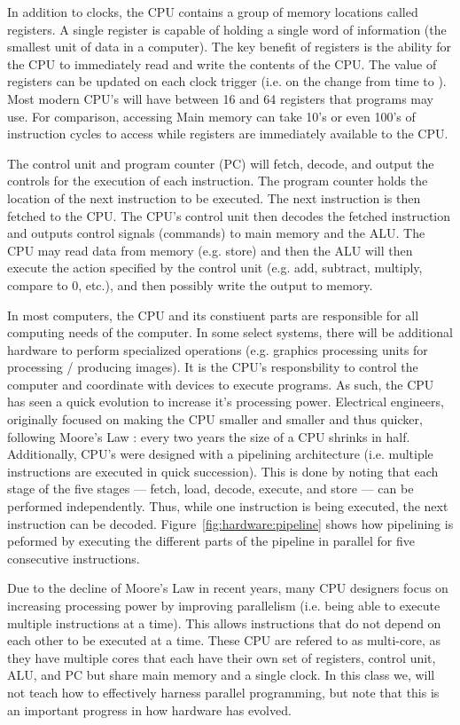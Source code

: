 In addition to clocks, the CPU contains a group of memory locations called registers.
A single register is capable of holding a single word of information (the smallest
unit of data in a computer). The key benefit of registers is the ability for the
CPU to immediately read and write the contents of the CPU. The value of registers
can be updated on each clock trigger (i.e. on the change from time  to ).
Most modern CPU's will have between 16 and 64 registers that programs may use.
For comparison, accessing Main memory can take 10's or even 100's of instruction
cycles to access while registers are immediately available to the CPU.

The control unit and program counter (PC) will fetch, decode, and output the
controls for the execution of each instruction. The program counter holds the
location of the next instruction to be executed. The next instruction is then
fetched to the CPU. The CPU's control unit then decodes the fetched instruction
and outputs control signals (commands) to main memory and the ALU. The CPU may
read data from memory (e.g. store) and then the ALU will then execute the action
specified by the control unit (e.g. add, subtract, multiply, compare to 0, etc.),
and then possibly write the output to memory.

In most computers, the CPU and its constiuent parts are responsible for all
computing needs of the computer. In some select systems, there will be additional
hardware to perform specialized operations (e.g. graphics processing units for
processing / producing images). It is the CPU's responsbility to control the
computer and coordinate with devices to execute programs. As such, the CPU
has seen a quick evolution to increase it's processing power. Electrical
engineers, originally focused on making the CPU smaller and smaller and thus
quicker, following Moore's Law : every two years the size of a CPU shrinks
in half. Additionally, CPU's were designed with a pipelining architecture
(i.e. multiple instructions are executed in quick succession). This is done
by noting that each stage of the five stages --- fetch, load,  decode, execute,
and store --- can be performed independently. Thus, while one instruction is
being executed, the next instruction can be decoded. Figure~\ref{fig:hardware:pipeline}
shows how pipelining is peformed by executing the different parts of the pipeline
in parallel for five consecutive instructions.

Due to the decline of Moore's Law in recent years, many CPU designers focus on
increasing processing power by improving parallelism (i.e. being able to execute
multiple instructions at a time). This allows instructions that do not depend
on each other to be executed at a time. These CPU are refered to as multi-core,
as they have multiple cores that each have their own set of registers, control unit,
ALU, and PC but share main memory and a single clock. In this class we, will not
teach how to effectively harness parallel programming, but note that this is
an important progress in how hardware has evolved.

